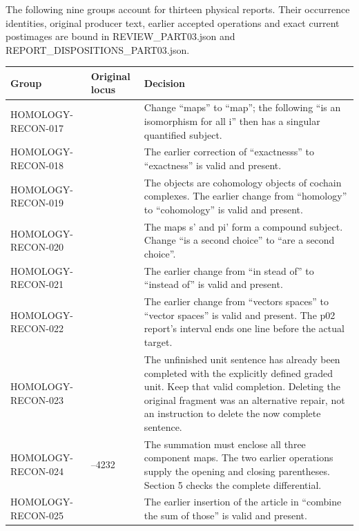 \documentclass[11pt]{article}
\begin{document}
The following nine groups account for thirteen physical reports. Their occurrence identities, original producer text, earlier accepted operations and exact current postimages are bound in REVIEW\_PART03.json and REPORT\_DISPOSITIONS\_PART03.json.

{ %
\begin{longtable}[]{@{}
  >{\raggedright\arraybackslash}p{}
  >{\raggedright\arraybackslash}p{}
  >{\raggedright\arraybackslash}p{}@{}}
\toprule\noalign{}
\begin{minipage}[b]{\linewidth}\raggedright
Group
\end{minipage} & \begin{minipage}[b]{\linewidth}\raggedright
Original locus
\end{minipage} & \begin{minipage}[b]{\linewidth}\raggedright
Decision
\end{minipage} \\
\midrule\noalign{}
\endhead
\bottomrule\noalign{}
\endlastfoot
HOMOLOGY-RECON-017 & 3165 & Change ``maps'' to ``map''; the following ``is an isomorphism for all i'' then has a singular quantified subject. \\
HOMOLOGY-RECON-018 & 3246 & The earlier correction of ``exactnesss'' to ``exactness'' is valid and present. \\
HOMOLOGY-RECON-019 & 3560 & The objects are cohomology objects of cochain complexes. The earlier change from ``homology'' to ``cohomology'' is valid and present. \\
HOMOLOGY-RECON-020 & 3577 & The maps s' and pi' form a compound subject. Change ``is a second choice'' to ``are a second choice''. \\
HOMOLOGY-RECON-021 & 3962 & The earlier change from ``in stead of'' to ``instead of'' is valid and present. \\
HOMOLOGY-RECON-022 & 4048 & The earlier change from ``vectors spaces'' to ``vector spaces'' is valid and present. The p02 report's interval ends one line before the actual target. \\
HOMOLOGY-RECON-023 & 4074 & The unfinished unit sentence has already been completed with the explicitly defined graded unit. Keep that valid completion. Deleting the original fragment was an alternative repair, not an instruction to delete the now complete sentence. \\
HOMOLOGY-RECON-024 & 4231--4232 & The summation must enclose all three component maps. The two earlier operations supply the opening and closing parentheses. Section 5 checks the complete differential. \\
HOMOLOGY-RECON-025 & 4242 & The earlier insertion of the article in ``combine the sum of those'' is valid and present. \\
\end{longtable}
}
\end{document}
